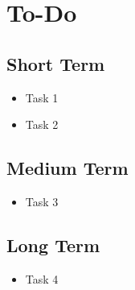 \section{To-Do}

\subsection{Short Term}
\begin{itemize}
    \item Task 1
    \item Task 2
\end{itemize}

\subsection{Medium Term}
\begin{itemize}
    \item Task 3
\end{itemize}

\subsection{Long Term}
\begin{itemize}
    \item Task 4
\end{itemize}